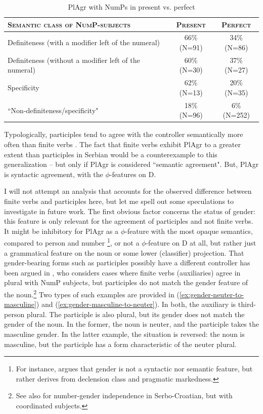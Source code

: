 \documentclass[output=paper,colorlinks,citecolor=brown
]{langscibook}
\begin{document}
\begin{table}[h]  %
    \centering
    \caption{PlAgr with NumPs in present vs. perfect}
    \label{tab:participles}
    \begin{tabular}{|l|c|c|}
        \hline
        \textsc{Semantic class of NumP-subjects} & \textsc{Present} & \textsc{Perfect} \\ [0.5ex]
        \hline\hline
        Definiteness (with a modifier left of the numeral) & 66\% (N=91) & 34\% (N=86) \\ 
        \hline
        Definiteness (without a modifier left of the numeral) & 60\% (N=30) & 37\% (N=27) \\ 
        \hline
        Specificity & 62\% (N=13) & 20\% (N=35) \\ 
        \hline
        ``Non-definiteness/specificity" & 18\% (N=96) & 6\% (N=252) \\ 
        \hline
    \end{tabular}
\end{table}

\noindent Typologically, participles tend to agree with the controller semantically more often than finite verbs \citep[233]{Corbett2006}. The fact that finite verbs exhibit PlAgr to a greater extent than participles in Serbian would be a counterexample to this generalization -- but only if PlAgr is considered ``semantic agreement". But, PlAgr is syntactic agreement, with the $\phi$-features on D.

I will not attempt an analysis that accounts for the observed difference between finite verbs and participles here, but let me spell out some speculations to investigate in future work. The first obvious factor concerns the status of gender: this feature is only relevant for the agreement of participles and not finite verbs. It might be inhibitory for PlAgr as a $\phi$-feature with the most opaque semantics, compared to person and number \citep{Milosavljevic2017, Milosavljevic2018MS}\footnote{For instance, \citet{Arsenijevic2021} argues that gender is not a syntactic nor semantic feature, but rather derives from declension class and pragmatic markedness.}, or not a $\phi$-feature on D at all, but rather just a grammatical feature on the noun or some lower (classifier) projection. That gender-bearing forms such as participles possibly have a different controller has been argued in \citet{Milosavljevic2020}, who considers cases where finite verbs (auxiliaries) agree in plural with NumP subjects, but participles do not match the gender feature of the noun.\footnote{See also \citet{Arsenijevic2016} for number-gender independence in Serbo-Croatian, but with coordinated subjects.} Two types of such examples are provided in (\ref{ex:gender-neuter-to-masculine}) and (\ref{ex:gender-masculine-to-neuter}). In both, the auxiliary is third-person plural. The participle is also plural, but its gender does not match the gender of the noun. In the former, the noun is neuter, and the participle takes the masculine gender. In the latter example, the situation is reversed: the noun is masculine, but the participle has a form characteristic of the neuter plural. 
\end{document}
